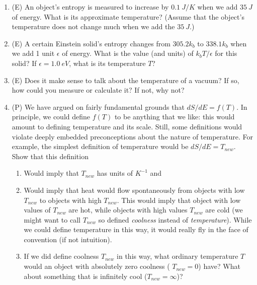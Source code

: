 \begin{enumerate}
 
\item (E) An object's entropy is measured to increase by $0.1~ J/K$ 
when we add $35~ J$ of energy.  What is its approximate temperature?  
(Assume that the object's temperature does not change much when we add the $35~J$.)

\item (E) A certain Einstein solid's entropy changes from 
$305.2k_b$ to $338.1k_b$ when we add 1 unit $\epsilon$ of energy.  
What is the value (and units) of $k_bT/\epsilon$ for this solid?  
If $\epsilon = 1.0~eV$, what is its temperature $T$?

\item (E) Does it make sense to talk about the 
temperature of a vacuum?  If so, how could you measure or calculate it?  
If not, why not?  




\item (P) We have argued on fairly fundamental grounds 
that $dS/dE = f(T)$.  In principle, we could define $f(T)$ to be anything 
that we like:  this would amount to defining temperature and its scale. 
Still, some definitions would violate deeply embedded preconceptions 
about the nature of temperature.  
For example, the simplest definition of temperature would be $dS/dE = T_{new}$.  
Show that this definition
\begin{enumerate}
\item Would imply that $T_{new}$ has units of $K^{-1}$ and
\item Would imply that heat would flow spontaneously from objects with 
low $T_{new}$ to objects with high $T_{new}$.  
This would imply that object with low values of $T_{new}$ are hot, while 
objects with high values $T_{new}$ are cold (we might want to call $T_{new}$ 
so defined {\it coolness} instead of {\it temperature}).  
While we could define temperature in this way, it would really fly 
in the face of convention (if not intuition).
\item If we did define coolness $T_{new}$ in this way, what ordinary 
temperature $T$ would an object with absolutely zero coolness (
$T_{new} = 0$) have?  What about something that is infinitely cool ($T_{new} = \infty$)?
\end{enumerate}


\end{enumerate}
